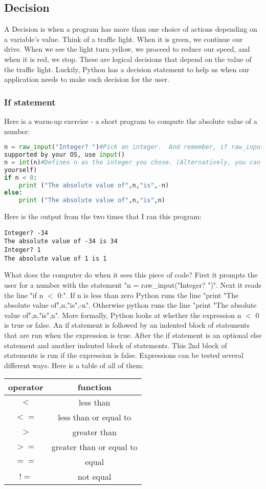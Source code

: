 \subsection{Decision}
A Decision is when a program has more than one choice of actions depending on a
variable's value. Think of a traffic light. When it is green, we continue our
drive. When we see the light turn yellow, we proceed to reduce our speed, and
when it is red, we stop. These are logical decisions that depend on the value of
the traffic light. Luckily, Python has a decision statement to help us when our
application needs to make such decision for the user.

\subsubsection{If statement}
Here is a warm-up exercise - a short program to compute the absolute value of a
number:
\lstset{basicstyle=\scriptsize, numbers=left, captionpos=b, tabsize=4}
\begin{lstlisting}[caption=absoval.py,language={Python},
xleftmargin=15pt, label=lst:absoval]
n = raw_input("Integer? ")#Pick an integer.  And remember, if raw_input is not
supported by your OS, use input()
n = int(n)#Defines n as the integer you chose. (Alternatively, you can define n
yourself)
if n < 0:
    print ("The absolute value of",n,"is",-n)
else:
    print ("The absolute value of",n,"is",n)
\end{lstlisting}

Here is the output from the two times that I ran this program:
\scriptsize
\begin{verbatim}
Integer? -34
The absolute value of -34 is 34
Integer? 1
The absolute value of 1 is 1
\end{verbatim}
\normalsize

What does the computer do when it sees this piece of code? First it prompts the
user for a number with the statement "n = raw\_input("Integer? ")". Next it reads
the line "if n $<$ 0:". If n is less than zero Python runs the line "print "The
absolute value of",n,"is",-n". Otherwise python runs the line "print "The
absolute value of",n,"is",n".
More formally, Python looks at whether the expression n $<$ 0 is true or false. An
if statement is followed by an indented block of statements that are run when
the expression is true. After the if statement is an optional else statement and
another indented block of statements. This 2nd block of statements is run if the
expression is false.
Expressions can be tested several different ways. Here is a table of all of
them:
\begin{tabular}{|c|c|}
\hline
operator&	function\\
\hline
$<$	&less than\\
\hline
$<=$	&less than or equal to\\
\hline
$>$	&greater than\\
\hline
$>=$	&greater than or equal to\\
\hline
$==$	&equal\\
\hline
$!=$	&not equal\\
\hline
\end{tabular}

